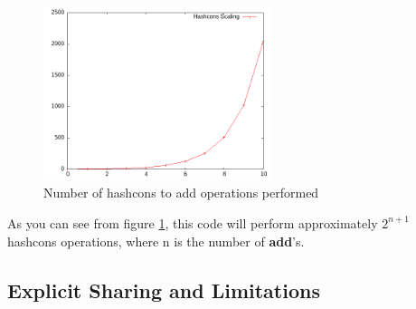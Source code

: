 \documentclass[runningheads]{llncs}
\begin{document}
\begin{figure}
  \centering
  \includegraphics[width=0.6\textwidth]{figs/hashcons.png}
  \caption{Number of hashcons to add operations performed} \label{fig:hashcons}
\end{figure}
As you can see from figure \ref{fig:hashcons}, this code will perform approximately
$2^{n+1}$ hashcons operations, where n is the number of {\bf add}'s.

\subsection{Explicit Sharing and Limitations}
\end{document}
